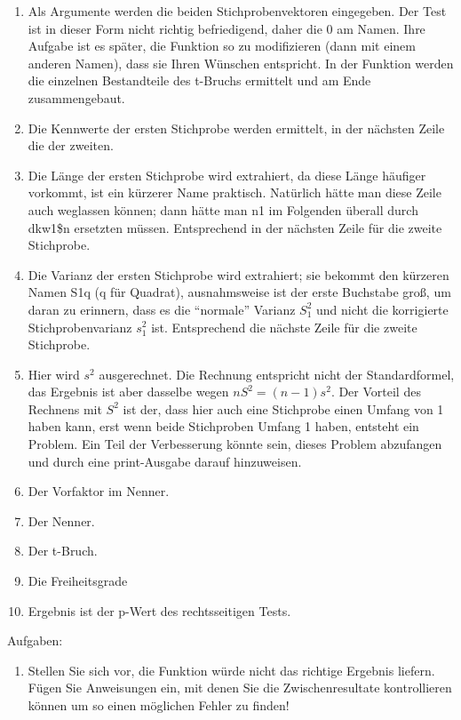 \documentclass[
]{book}
\providecommand{\tightlist}{%
  \setlength{\itemsep}{0pt}\setlength{\parskip}{0pt}}
\begin{document}
\begin{enumerate}
\def\labelenumi{(\arabic{enumi})}
\item
  Als Argumente werden die beiden Stichprobenvektoren eingegeben. Der Test ist in dieser Form nicht richtig befriedigend, daher die 0 am Namen. Ihre Aufgabe ist es später, die Funktion so zu modifizieren (dann mit einem anderen Namen), dass sie Ihren Wünschen entspricht. In der Funktion werden die einzelnen Bestandteile des t-Bruchs ermittelt und am Ende zusammengebaut.
\item
  Die Kennwerte der ersten Stichprobe werden ermittelt, in der nächsten Zeile die der zweiten.
\item
  Die Länge der ersten Stichprobe wird extrahiert, da diese Länge häufiger vorkommt, ist ein kürzerer Name praktisch. Natürlich hätte man diese Zeile auch weglassen können; dann hätte man n1 im Folgenden überall durch dkw1\$n ersetzten müssen. Entsprechend in der nächsten Zeile für die zweite Stichprobe.
\item
  Die Varianz der ersten Stichprobe wird extrahiert; sie bekommt den kürzeren Namen S1q (q für Quadrat), ausnahmsweise ist der erste Buchstabe groß, um daran zu erinnern, dass es die ``normale'' Varianz \(S_1^2\) und nicht die korrigierte Stichprobenvarianz \(s_1^2\) ist. Entsprechend die nächste Zeile für die zweite Stichprobe.
\item
  Hier wird \(s^2\) ausgerechnet. Die Rechnung entspricht nicht der Standardformel, das Ergebnis ist aber dasselbe wegen \(nS^2=(n-1)s^2\). Der Vorteil des Rechnens mit \(S^2\) ist der, dass hier auch eine Stichprobe einen Umfang von 1 haben kann, erst wenn beide Stichproben Umfang 1 haben, entsteht ein Problem. Ein Teil der Verbesserung könnte sein, dieses Problem abzufangen und durch eine print-Ausgabe darauf hinzuweisen.
\item
  Der Vorfaktor im Nenner.
\item
  Der Nenner.
\item
  Der t-Bruch.
\item
  Die Freiheitsgrade
\item
  Ergebnis ist der p-Wert des rechtsseitigen Tests.
\end{enumerate}

Aufgaben:

\begin{enumerate}
\def\labelenumi{(\arabic{enumi})}
\tightlist
\item
  Stellen Sie sich vor, die Funktion würde nicht das richtige Ergebnis liefern. Fügen Sie Anweisungen ein, mit denen Sie die Zwischenresultate kontrollieren können um so einen möglichen Fehler zu finden!
\end{enumerate}
\end{document}
